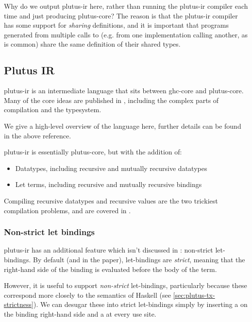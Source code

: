 Why do we output \gls{plutus-ir} here, rather than running the \gls{plutus-ir} compiler each time and just producing \gls{plutus-core}?
The reason is that the \gls{plutus-ir} compiler has some support for \emph{sharing} definitions, and it is important that programs generated from multiple calls to  (e.g. from one implementation calling another, as is common) share the same definition of their shared types.

\subsection{Plutus IR}
\label{sec:plutus-ir}

\Gls{plutus-ir} is an intermediate language that sits between \gls{ghc-core} and \gls{plutus-core}.
Many of the core ideas are published in \textcite{peytonjones2019unraveling}, including the complex parts of compilation and the typesystem.

We give a high-level overview of the language here, further details can be found in the above reference.

\Gls{plutus-ir} is essentially \gls{plutus-core}, but with the addition of:
\begin{itemize}
\item Datatypes, including recursive and mutually recursive datatypes
\item Let terms, including recursive and mutually recursive bindings
\end{itemize}

Compiling recursive datatypes and recursive values are the two trickiest compilation problems, and are covered in \textcite{peytonjones2019unraveling}.

\subsubsection{Non-strict let bindings}
\label{sec:pir-non-strict}

\Gls{plutus-ir} has an additional feature which isn't discussed in \textcite{peytonjones2019unraveling}: non-strict let-bindings.
By default (and in the paper), let-bindings are \emph{strict}, meaning that the right-hand side of the binding is evaluated before the body of the term.

However, it is useful to support \emph{non-strict} let-bindings, particularly because these correspond more closely to the semantics of Haskell (see \cref{sec:plutus-tx-strictness}).
We can desugar these into strict let-bindings simply by inserting a  on the binding right-hand side and a  at every use site.

